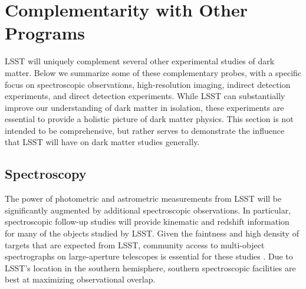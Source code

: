 \chapter{Complementarity with Other Programs}
\label{sec:complementarity}
\bigskip


LSST will uniquely complement several other experimental studies of dark matter.
Below we summarize some of these complementary probes, with a specific focus on spectroscopic observations, high-resolution imaging, indirect detection experiments, and direct detection experiments.
While LSST can substantially improve our understanding of dark matter in isolation, these experiments are essential to provide a holistic picture of dark matter physics.
This section is not intended to be comprehensive, but rather serves to demonstrate the influence that LSST will have on dark matter studies generally.

\section{Spectroscopy }
\label{sec:spectroscopy}

The power of photometric and astrometric measurements from LSST will be significantly augmented by additional spectroscopic observations.
In particular, spectroscopic follow-up studies will provide kinematic and redshift information for many of the objects studied by LSST.
Given the faintness and high density of targets that are expected from LSST, community access to multi-object spectrographs on large-aperture telescopes is essential for these studies \citep{2016arXiv161001661N}. 
Due to LSST's location in the southern hemisphere, southern spectroscopic facilities are best at maximizing observational overlap.

